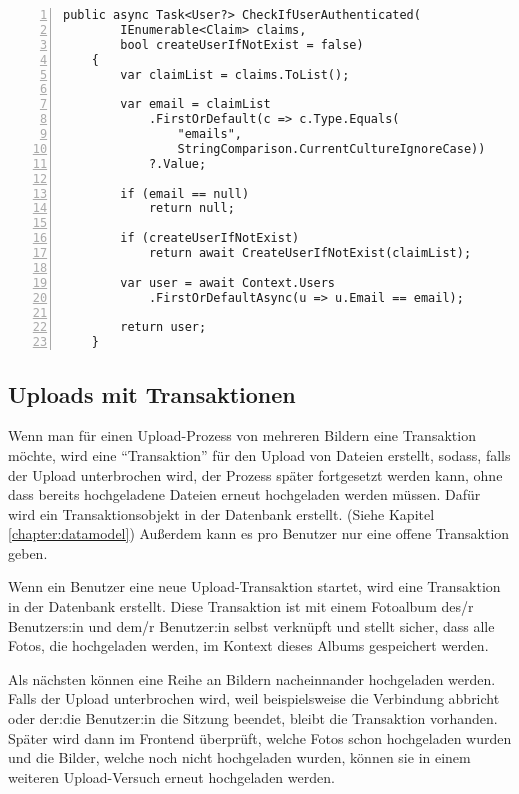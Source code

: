 \begin{lstlisting}[numbers=left,caption={Methode CheckIfUserAuthenticated},label={lst:method-check-user-auth}]
    public async Task<User?> CheckIfUserAuthenticated(
        IEnumerable<Claim> claims, 
        bool createUserIfNotExist = false)
    {
        var claimList = claims.ToList();
        
        var email = claimList
            .FirstOrDefault(c => c.Type.Equals(
                "emails", 
                StringComparison.CurrentCultureIgnoreCase))
            ?.Value;

        if (email == null)
            return null;

        if (createUserIfNotExist)
            return await CreateUserIfNotExist(claimList); 
        
        var user = await Context.Users
            .FirstOrDefaultAsync(u => u.Email == email);

        return user;
    }
\end{lstlisting}


\subsection{Uploads mit Transaktionen}

Wenn man für einen Upload-Prozess von mehreren Bildern eine Transaktion möchte, wird eine 
``Transaktion'' für den Upload von Dateien erstellt, sodass, falls der Upload unterbrochen 
wird, der Prozess später fortgesetzt werden kann, ohne dass bereits hochgeladene Dateien 
erneut hochgeladen werden müssen. Dafür wird ein Transaktionsobjekt in der Datenbank 
erstellt. (Siehe Kapitel \ref{chapter:datamodel}) Außerdem kann es pro Benutzer nur 
eine offene Transaktion geben.

Wenn ein Benutzer eine neue Upload-Transaktion startet, wird eine Transaktion in der 
Datenbank erstellt. Diese Transaktion ist mit einem Fotoalbum des/r Benutzers:in und dem/r 
Benutzer:in selbst verknüpft und stellt sicher, dass alle Fotos, die hochgeladen werden, 
im Kontext dieses Albums gespeichert werden.

Als nächsten können eine Reihe an Bildern nacheinnander hochgeladen werden. 
Falls der Upload unterbrochen wird, weil beispielsweise die Verbindung abbricht oder der:die 
Benutzer:in die Sitzung beendet, bleibt die Transaktion vorhanden. Später wird dann im Frontend
überprüft, welche Fotos schon hochgeladen wurden und die Bilder, welche noch nicht hochgeladen 
wurden, können sie in einem weiteren Upload-Versuch erneut hochgeladen werden.

